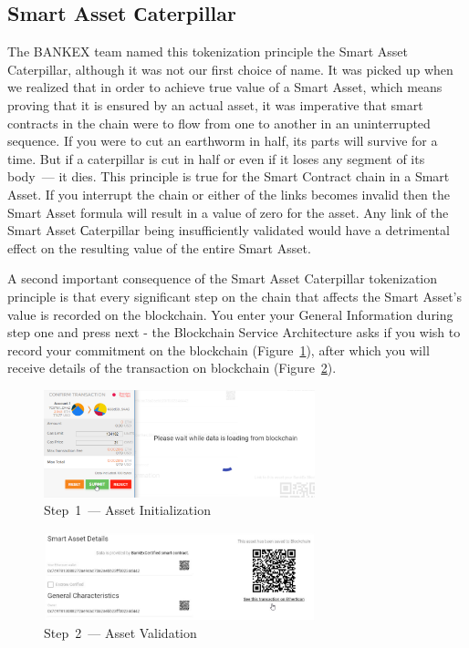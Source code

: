 \documentclass{article}
\begin{document}
\begin{multicols}{2}
\subsection{Smart Asset Сaterpillar}

The BANKEX team named this tokenization principle the Smart Asset Caterpillar, although it was not our first choice of name. It was picked up when we realized that in order to achieve true value of a Smart Asset, which means proving that it is ensured by an actual asset, it was imperative that smart contracts in the chain were to flow from one to another in an uninterrupted sequence. If you were to cut an earthworm in half, its parts will survive for a time. But if a caterpillar is cut in half or even if it loses any segment of its body~--- it dies. This principle is true for the Smart Contract chain in a Smart Asset. If you interrupt the chain or either of the links becomes invalid then the Smart Asset formula will result in a value of zero for the asset. Any link of the Smart Asset Сaterpillar being insufficiently validated would have a detrimental effect on the resulting value of the entire Smart Asset. 

A second important consequence of the Smart Asset Caterpillar tokenization principle is that every significant step on the chain that affects the Smart Asset’s value is recorded on the blockchain. You enter your General Information during step one and press next - the Blockchain Service Architecture asks if you wish to record your commitment on the blockchain (Figure~\ref{fig:asset-creation}), after which you will receive details of the transaction on blockchain (Figure~\ref{fig:asset-detail}).

\begin{figure}
  \centering
  \includegraphics[width=0.7\textwidth]{asset-creation.png}
  \caption{Step~1~--- Asset Initialization}
  \label{fig:asset-creation}
\end{figure}

\begin{figure}
  \centering
  \includegraphics[width=0.7\textwidth]{asset-detail}
  \caption{Step~2~--- Asset Validation}
  \label{fig:asset-detail}
\end{figure}


\end{multicols}
\end{document}
